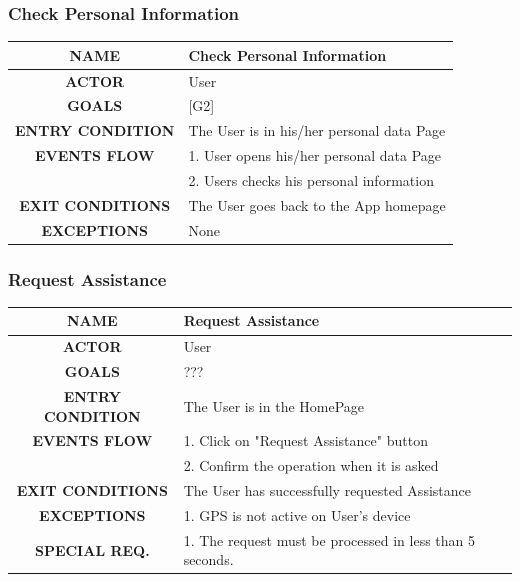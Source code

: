\documentclass[12pt,a4paper]{article}
\begin{document}
		\subsubsection{Check Personal Information}
		\begin{center}
			\begin{tabular}{| c | l |}
				\hline
				\textbf{NAME} & Check Personal Information \\
				\hline
				\textbf{ACTOR} & User \\
				\hline
				\textbf{GOALS} & [G2] \\
				\hline
				\textbf{ENTRY CONDITION} & The User is in his/her personal data Page \\ \hline
				\textbf{EVENTS FLOW}  &
				1. User opens his/her personal data Page\\
				&2. Users checks his personal information\\
				\hline
				\textbf{EXIT CONDITIONS}  & The User goes back to the App homepage \\ \hline
				\textbf{EXCEPTIONS} & 
				None\\
				\hline
			\end{tabular}
		\end{center}
	
		\subsubsection{Request Assistance}
		\begin{center}
			\begin{tabular}{| c | l |}
				\hline
				\textbf{NAME} & Request Assistance \\
				\hline
				\textbf{ACTOR} & User \\
				\hline
				\textbf{GOALS} & ??? \\
				\hline
				\textbf{ENTRY CONDITION} & The User is in the HomePage \\ \hline
				\textbf{EVENTS FLOW}  &
				1. Click on "Request Assistance" button\\
				&2. Confirm the operation when it is asked\\
				\hline
				\textbf{EXIT CONDITIONS}  & The User has successfully requested Assistance \\ \hline
				\textbf{EXCEPTIONS} & 
				1. GPS is not active on User's device\\ \hline
				\textbf{SPECIAL REQ.} & 
				1. The request must be processed in less than 5 seconds.\\
				\hline
			\end{tabular}
		\end{center}
	
\end{document}
